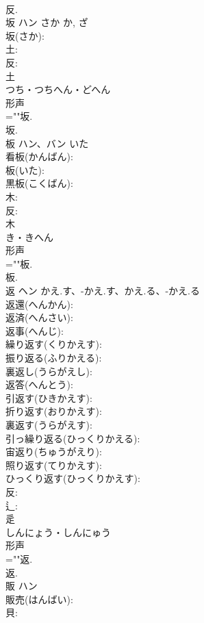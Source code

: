 \documentclass[8pt]{extreport}
\begin{document}
\begin{CJK}{UTF8}{min}
\\	反.
\\	坂	ハン	さか	か, ざ	
\\	坂(さか): 
\\	土: 
\\	反: 
\\	土	
\\	つち・つちへん・どへん	
\\	形声 
\\	=""坂.
\\	坂.
\\	板	ハン、バン	いた		
\\	看板(かんばん): 
\\	板(いた): 
\\	黒板(こくばん): 
\\	木: 
\\	反: 
\\	木	
\\	き・きへん	
\\	形声 
\\	=""板.
\\	板.
\\	返	ヘン	かえ.す、-かえ.す、かえ.る、-かえ.る		
\\	返還(へんかん): 
\\	返済(へんさい): 
\\	返事(へんじ): 
\\	繰り返す(くりかえす): 
\\	振り返る(ふりかえる): 
\\	裏返し(うらがえし): 
\\	返答(へんとう): 
\\	引返す(ひきかえす): 
\\	折り返す(おりかえす): 
\\	裏返す(うらがえす): 
\\	引っ繰り返る(ひっくりかえる): 
\\	宙返り(ちゅうがえり): 
\\	照り返す(てりかえす): 
\\	ひっくり返す(ひっくりかえす): 
\\	反: 
\\	辶: 
\\	辵	
\\	しんにょう・しんにゅう	
\\	形声 
\\	=""返.
\\	返.
\\	販	ハン			
\\	販売(はんばい): 
\\	貝: 

\end{CJK}
\end{document}

